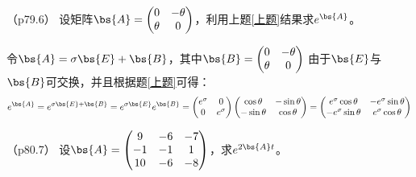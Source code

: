 \documentclass[12pt, a4paper, oneside, UTF8]{ctexbook}
\begin{document}
\begin{question}（p79.6）
    设矩阵$\bs{A}=\begin{pmatrix}
        0 & -\theta \\
        \theta & 0
    \end{pmatrix}$，利用上题\ref{上题}结果求$e^{\bs{A}}$。
\end{question}

\begin{solution}
    令$\bs{A}=\sigma \bs{E}+\bs{B}$，其中$\bs{B}=\begin{pmatrix}
         0 & -\theta \\
         \theta & 0
    \end{pmatrix}$
    由于$\bs{E}$与$\bs{B}$可交换，并且根据题\ref{上题}可得：
    \begin{align*}
        e^{\bs{A}}=e^{\sigma \bs{E}+\bs{B}}=e^{\sigma \bs{E}} e^{\bs{B}}
        =\begin{pmatrix}
            e^{\sigma} & 0\\
            0 & e^{\sigma}
        \end{pmatrix} \begin{pmatrix}
            \cos \theta  &-\sin \theta  \\
            -\sin \theta  & \cos \theta 
        \end{pmatrix}=\begin{pmatrix}
            e^{\sigma} \cos \theta  &-e^{\sigma}\sin \theta  \\
            -e^{\sigma} \sin \theta  & e^{\sigma}\cos \theta 
        \end{pmatrix}
    \end{align*}
\end{solution}


\begin{question}（p80.7）
    设$\bs{A}=\begin{pmatrix}
        9 &-6 &  -7 \\
        -1 & -1 & 1 \\
        10 & -6 & -8
    \end{pmatrix}$，求$e^{2\bs{A}t}$。
\end{question}
\end{document}
